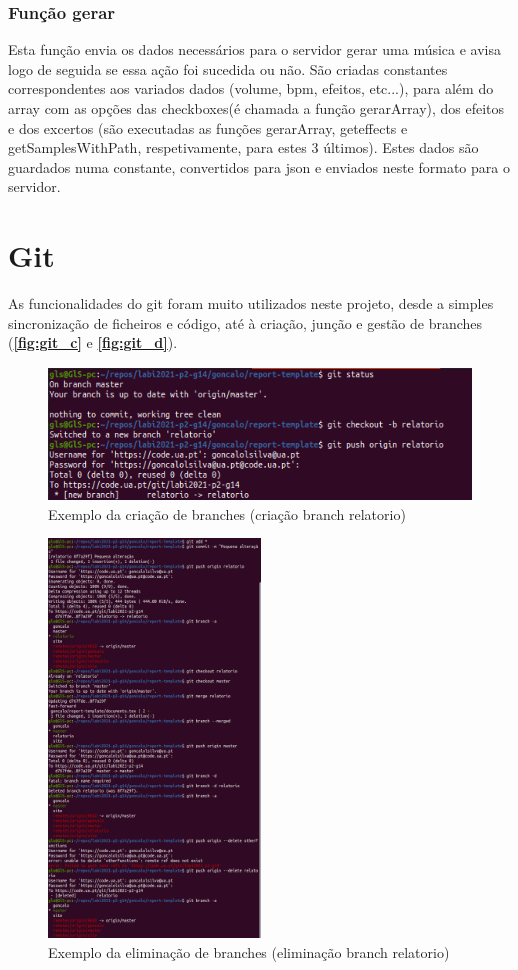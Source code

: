 \documentclass{report}
\begin{document}
\subsubsection{Função gerar}
\hspace{5pt}Esta função envia os dados necessários para o servidor gerar uma música e avisa logo de seguida 
se essa ação foi sucedida ou não. São criadas constantes correspondentes aos variados dados (volume, \ac{bpm}, 
efeitos, etc...), para além do array com as opções das checkboxes(é chamada a função gerarArray), dos efeitos e 
dos excertos (são executadas as funções gerarArray, geteffects e getSamplesWithPath, respetivamente, para estes 
3 últimos). Estes dados são guardados numa constante, convertidos para \ac{json} e enviados neste formato para 
o servidor. 
\label{ssec:JS}


\section{Git}
\label{sec:git}
As funcionalidades do git foram muito utilizados neste projeto, desde a simples sincronização 
de ficheiros e código, até à criação, junção e gestão de branches (\textbf{\autoref{fig:git_c}} e 
\textbf{\autoref{fig:git_d}}). 
\cite{git}

\begin{figure}[!h]
\center 
\includegraphics[height=100pt]{img/git_1.png}
\caption{Exemplo da criação de branches (criação branch relatorio)}
\label{fig:git_c}
\end{figure}

\begin{figure}[!h]
\center 
\includegraphics[height=300pt]{img/git_2.png}
\caption{Exemplo da eliminação de branches (eliminação branch relatorio)}
\label{fig:git_d}
\end{figure}
\end{document}
